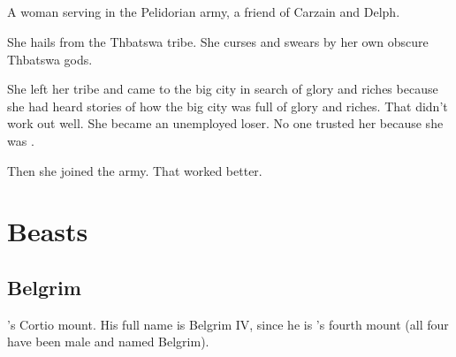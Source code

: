 \section{\Tsekkect}
A \meccaran{} woman serving in the Pelidorian army, a friend of Carzain and Delph. 

She hails from the Thbatswa tribe. 
She curses and swears by her own obscure Thbatswa gods. 

She left her tribe and came to the big city in search of glory and riches because she had heard stories of how the big city was full of glory and riches. 
That didn't work out well. 
She became an unemployed loser. 
No one trusted her because she was \meccaran. 

Then she joined the army. 
That worked better. 






































\chapter{Beasts}















\section{Belgrim}
\Narkiza's Cortio mount. His full name is Belgrim IV, since he is \Narkiza's fourth mount (all four have been male and named Belgrim). 















